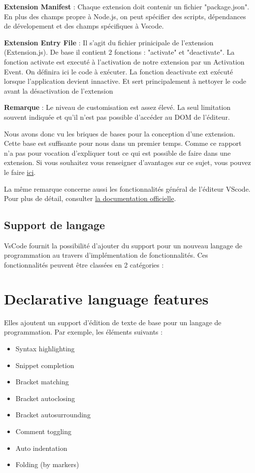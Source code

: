 \documentclass[
    iict, %
    il, %
]{heig-tb}
\begin{document}
\textbf{Extension Manifest} :
Chaque extension doit contenir un fichier "package.json". En plus des champs propre à Node.js, on peut spécifier des scripts, dépendances de dévelopement et des champs spécifiques à Vscode.

\textbf{Extension Entry File} :
Il s'agit du fichier prinicipale de l'extension (Extension.js).
De base il contient 2 fonctions : "activate" et "deactivate".
La fonction activate est executé à l'activation de notre extension par un Activation Event. On définira ici le code à exécuter.
La fonction deactivate  ext exécuté lorsque l'application devient innactive. Et sert principalement à nettoyer le code avant la désactivation de l'extension

\textbf{Remarque} : Le niveau de customisation est assez élevé. La seul limitation souvent indiquée et qu'il n'est pas possible d'accéder au DOM de l'éditeur.

Nous avons donc vu les briques de bases pour la conception d'une extension. Cette base est suffisante pour nous dans un premier temps.
Comme ce rapport n'a pas pour vocation d'expliquer tout ce qui est possible de faire dans une extension. Si vous souhaitez vous renseigner d'avantages sur ce sujet, vous pouvez le faire \href{https://code.visualstudio.com/api}{ici}.

La même remarque concerne aussi les fonctionnalités général de l'éditeur VScode. Pour plus de détail, consulter \href{https://code.visualstudio.com/docs}{la documentation officielle}.

\subsection{Support de langage}
VsCode fournit la possibilité d'ajouter du support pour un nouveau langage de programmation au travers d'implémentation de fonctionnalités. Ces fonctionnalités peuvent être classées en 2 catégories :

\section{Declarative language features}
Elles ajoutent un support d'édition de texte de base pour un langage de programmation.
Par exemple, les éléments suivants :

\begin{itemize}
    \item Syntax highlighting
    \item Snippet completion
    \item Bracket matching
    \item Bracket autoclosing
    \item Bracket autosurrounding
    \item Comment toggling
    \item Auto indentation
    \item Folding (by markers)
\end{itemize}
\end{document}
